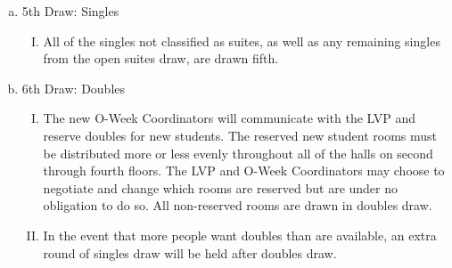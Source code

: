 \documentclass[USletter,12pt]{article}
\begin{document}
\begin{enumerate}[(a)]
\item 5th Draw: Singles
	\begin{enumerate}[(I)]
	\item All of the singles not classified as suites, as well as any remaining singles from the open suites draw, are drawn fifth.
	\end{enumerate}
\item 6th Draw: Doubles
	\begin{enumerate}[(I)]
	\item The new O-Week Coordinators will communicate with the LVP and reserve doubles for new students.  The reserved new student rooms must be distributed more or less evenly throughout all of the halls on second through fourth floors.  The LVP and O-Week Coordinators may choose to negotiate and change which rooms are reserved but are under no obligation to do so.  All non-reserved rooms are drawn in doubles draw.
	\item In the event that more people want doubles than are available, an extra round of singles draw will be held after doubles draw.
	\end{enumerate}
\end{enumerate}
\end{document}
